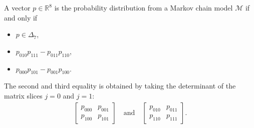 \documentclass[a4paper, 11pt]{article}
\begin{document}
\begin{prop}
  A vector \( p \in \mathbb R^8 \) is the probability distribution from a Markov chain model \( \mathcal{M} \) if and only if 
  \begin{itemize}
    \item \( p \in \Delta_7 \),
    \item \( p_{010}p_{111} - p_{011} p_{110} \),
    \item \( p_{000}p_{101} - p_{001}p_{100} \).
  \end{itemize}
  The second and third equality is obtained by taking the determinant of the matrix slices \( j=0 \) and \( j = 1 \):
  \begin{align*}
    \begin{bmatrix}
      p_{000} & p_{001} \\
      p_{100} & p_{101}
    \end{bmatrix} \quad \text{and} \quad 
    \begin{bmatrix}
      p_{010} & p_{011} \\
      p_{110} & p_{111}
    \end{bmatrix}.
  \end{align*}
\end{prop}
\end{document}
